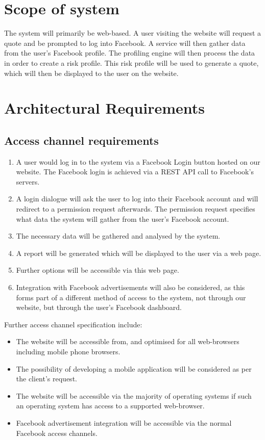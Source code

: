\documentclass{article}
\begin{document}
\section{Scope of system}
The system will primarily be web-based. A user visiting the website will request a quote and be prompted to log into Facebook. A service will then gather data from the user’s Facebook profile. The profiling engine will then process the data in order to create a risk profile. This risk profile will be used to generate a quote, which will then be displayed to the user on the website.

\section{Architectural Requirements}
	\subsection{Access channel requirements}
	\begin{enumerate}
		\item A user would log in to the system via a Facebook Login button hosted on our website. The Facebook login is achieved via a REST API call to Facebook's servers.
		\item A login dialogue will ask the user to log into their Facebook account and will redirect to a permission request afterwards. The permission request specifies what data the system will gather from the user's Facebook account.
		\item The necessary data will be gathered and analysed by the system.
		\item A report will be generated which will be displayed to the user via a web page.
		\item Further options will be accessible via this web page. 
		\item Integration with Facebook advertisements will also be considered, as this forms part of a different method of access to the system, not through our website, but through the user's Facebook dashboard.
	\end{enumerate}
	Further access channel specification include:
	\begin{itemize}
		\item The website will be accessible from, and optimised for all web-browsers including mobile phone browsers.
		\item The possibility of developing a mobile application will be considered as per the client's request.
		\item The website will be accessible via the majority of operating systems if such an operating system has access to a supported web-browser.
		\item Facebook advertisement integration will be accessible via the normal Facebook access channels.
	\end{itemize}
	 
\end{document}
